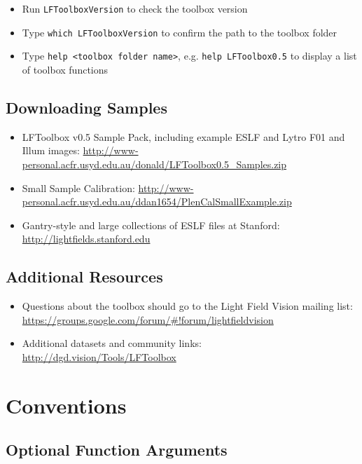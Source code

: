 \documentclass[onecolumn]{article}
\newcommand{\SymbolText}[1]{\texttt{\small #1}}
\begin{document}
\begin{itemize}[leftmargin=2.8em,itemsep=0em,rightmargin=0.5cm]
\item Run \SymbolText{LFToolboxVersion} to check the toolbox version
\item Type \SymbolText{which LFToolboxVersion} to confirm the path to the toolbox folder
\item Type \SymbolText{help <toolbox folder name>}, e.g. \SymbolText{help LFToolbox0.5} to display a list of toolbox functions
\end{itemize} 

\subsection{Downloading Samples}

\begin{itemize}[leftmargin=2.2em,itemsep=0em,rightmargin=0.5cm]
\item LFToolbox v0.5 Sample Pack, including example ESLF and Lytro F01 and Illum images: \url{http://www-personal.acfr.usyd.edu.au/donald/LFToolbox0.5_Samples.zip}
\item Small Sample Calibration: \url{http://www-personal.acfr.usyd.edu.au/ddan1654/PlenCalSmallExample.zip}
\item Gantry-style and large collections of ESLF files at Stanford: \url{http://lightfields.stanford.edu}
\end{itemize}

\subsection{Additional Resources}

\begin{itemize}
\item Questions about the toolbox should go to the Light Field Vision mailing list: \url{https://groups.google.com/forum/#!forum/lightfieldvision}
\item Additional datasets and community links: \url{http://dgd.vision/Tools/LFToolbox}
\end{itemize}

\section{Conventions}

\subsection{Optional Function Arguments}
\end{document}
